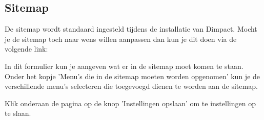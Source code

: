 \subsection{Sitemap}\label{sitemap}
De sitemap wordt standaard ingesteld tijdens de installatie van Dimpact. Mocht je de sitemap toch naar wens willen aanpassen dan kun je dit doen via de volgende link: 

In dit formulier kun je aangeven wat er in de sitemap moet komen te staan. Onder het kopje 'Menu's die in de sitemap moeten worden opgenomen' kun je de verschillende menu's selecteren die toegevoegd dienen te worden aan de sitemap.

Klik onderaan de pagina op de knop 'Instellingen opslaan' om te instellingen op te slaan.